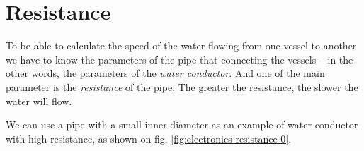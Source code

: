 \documentclass[../sparc.tex]{subfiles}
\begin{document}
\section{Resistance}
\label{section:electronics-resistance}

To be able to calculate the speed of the water flowing from one vessel to
another we have to know the parameters of the pipe that connecting the vessels --
in the other words, the parameters of the \emph{water conductor}.  And one of
the main parameter is the \emph{resistance} of the pipe.  The greater the
resistance, the slower the water will flow.

We can use a pipe with a small inner diameter as an example of water conductor
with high resistance, as shown on fig. \ref{fig:electronics-resistance-0}.
\end{document}
